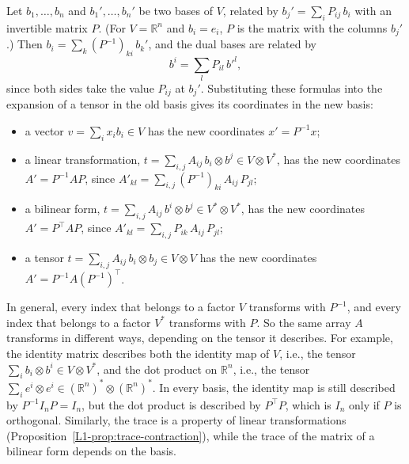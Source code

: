 Let $b_1, \ldots, b_n$ and $b_1', \ldots, b_n'$ be two bases of $V$, related by $b_j' = \sum_i P_{ij}\, b_i$ with an invertible matrix $P$. (For $V = \mathbb{R}^n$ and $b_i = e_i$, $P$ is the matrix with the columns $b_j'$.) Then $b_i = \sum_k (P^{-1})_{ki}\, b_k'$, and the dual bases are related by
\[b^i = \sum_l P_{il}\, b'^l,\]
since both sides take the value $P_{ij}$ at $b_j'$. Substituting these formulas into the expansion of a tensor in the old basis gives its coordinates in the new basis:
\begin{itemize}
    \item a vector $v = \sum_i x_ib_i \in V$ has the new coordinates $x' = P^{-1}x$;
    \item a linear transformation, $t = \sum_{i,j} A_{ij}\, b_i \otimes b^j \in V \otimes V^*$, has the new coordinates $A' = P^{-1}AP$, since $A'_{kl} = \sum_{i,j} (P^{-1})_{ki}\, A_{ij}\, P_{jl}$;
    \item a bilinear form, $t = \sum_{i,j} A_{ij}\, b^i \otimes b^j \in V^* \otimes V^*$, has the new coordinates $A' = P^\top AP$, since $A'_{kl} = \sum_{i,j} P_{ik}\, A_{ij}\, P_{jl}$;
    \item a tensor $t = \sum_{i,j} A_{ij}\, b_i \otimes b_j \in V \otimes V$ has the new coordinates $A' = P^{-1}A(P^{-1})^\top$.
\end{itemize}
In general, every index that belongs to a factor $V$ transforms with $P^{-1}$, and every index that belongs to a factor $V^*$ transforms with $P$. So the same array $A$ transforms in different ways, depending on the tensor it describes. For example, the identity matrix describes both the identity map of $V$, i.e., the tensor $\sum_i b_i \otimes b^i \in V \otimes V^*$, and the dot product on $\mathbb{R}^n$, i.e., the tensor $\sum_i e^i \otimes e^i \in (\mathbb{R}^n)^* \otimes (\mathbb{R}^n)^*$. In every basis, the identity map is still described by $P^{-1}I_nP = I_n$, but the dot product is described by $P^\top P$, which is $I_n$ only if $P$ is orthogonal. Similarly, the trace is a property of linear transformations (Proposition~\ref{L1-prop:trace-contraction}), while the trace of the matrix of a bilinear form depends on the basis.

